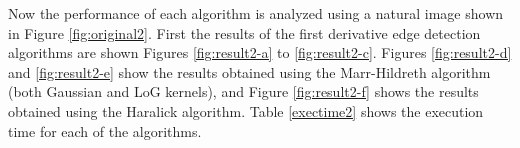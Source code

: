 \documentclass{ipol}
\numberwithin{equation}{section}
\numberwithin{table}{section}
\begin{document}
{Now the performance of each algorithm is analyzed using a natural image shown in Figure \ref{fig:original2}. 
First the results of the first derivative edge detection algorithms are shown Figures \ref{fig:result2-a} to \ref{fig:result2-c}. Figures \ref{fig:result2-d} and \ref{fig:result2-e} show the results obtained using the Marr-Hildreth algorithm (both Gaussian and LoG kernels), and Figure \ref{fig:result2-f} shows the results obtained using the Haralick algorithm. Table \ref{exectime2} shows the execution time for each of the algorithms. 

\begin{figure}[h!]
	\centering
	\quad
	
	\quad


\end{figure}}
\end{document}
